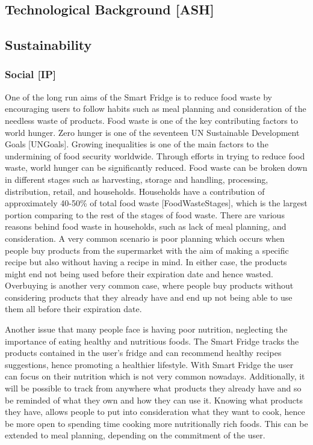 \subsection{Technological Background [ASH]}
\blindtext

\subsection{ Sustainability}

\subsubsection{Social [IP]}

One of the long run aims of the Smart Fridge is to reduce food waste by encouraging users to follow habits such as meal planning and consideration of the needless waste of products.
Food waste is one of the key contributing factors to world hunger.
Zero hunger is one of the seventeen UN Sustainable Development Goals [UNGoals].
Growing inequalities is one of the main factors to the undermining of food security worldwide.
Through efforts in trying to reduce food waste, world hunger can be significantly reduced.
Food waste can be broken down in different stages such as harvesting, storage and handling, processing, distribution, retail, and households.
Households have a contribution of approximately 40-50\% of total food waste [FoodWasteStages], which is the largest portion comparing to the rest of the stages of food waste.
There are various reasons behind food waste in households, such as lack of meal planning, and consideration.
A very common scenario is poor planning which occurs when people buy products from the supermarket with the aim of making a specific recipe but also without having a recipe in mind.
In either case, the products might end not being used before their expiration date and hence wasted.
Overbuying is another very common case, where people buy products without considering products that they already have and end up not being able to use them all before their expiration date.  

Another issue that many people face is having poor nutrition, neglecting the importance of eating healthy and nutritious foods.
The Smart Fridge tracks the products contained in the user's fridge and can recommend healthy recipes suggestions, hence promoting a healthier lifestyle.
With Smart Fridge the user can focus on their nutrition which is not very common nowadays.
Additionally, it will be possible to track from anywhere what products they already have and so be reminded of what they own and how they can use it.
Knowing what products they have, allows people to put into consideration what they want to cook, hence be more open to spending time cooking more nutritionally rich foods.
This can be extended to meal planning, depending on the commitment of the user.

